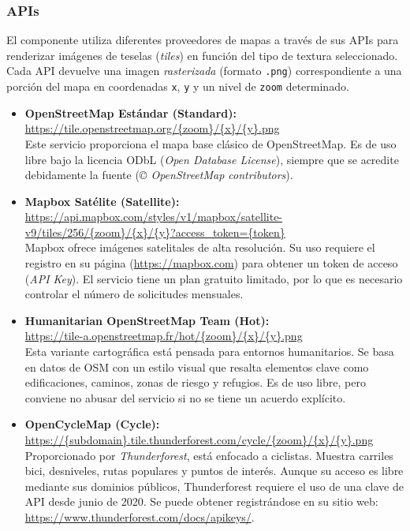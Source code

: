 \documentclass[a4paper, 12pt]{book}
\begin{document}
\subsubsection*{APIs}

El componente utiliza diferentes proveedores de mapas a través de sus APIs para renderizar imágenes de teselas (\textit{tiles}) en función del tipo de textura seleccionado. Cada API devuelve una imagen \textit{rasterizada} (formato \texttt{.png}) correspondiente a una porción del mapa en coordenadas \texttt{x}, \texttt{y} y un nivel de \texttt{zoom} determinado.

\begin{itemize}
    \item \textbf{OpenStreetMap Estándar (Standard):} \\
    \url{https://tile.openstreetmap.org/\{zoom\}/\{x\}/\{y\}.png} \\
    Este servicio proporciona el mapa base clásico de OpenStreetMap. Es de uso libre bajo la licencia ODbL (\textit{Open Database License}), siempre que se acredite debidamente la fuente (\textit{© OpenStreetMap contributors}).

    \item \textbf{Mapbox Satélite (Satellite):} \\
    \url{https://api.mapbox.com/styles/v1/mapbox/satellite-v9/tiles/256/\{zoom\}/\{x\}/\{y\}?access_token=\{token\}} \\
    Mapbox ofrece imágenes satelitales de alta resolución. Su uso requiere el registro en su página (\url{https://mapbox.com}) para obtener un token de acceso (\textit{API Key}). El servicio tiene un plan gratuito limitado, por lo que es necesario controlar el número de solicitudes mensuales.

    \item \textbf{Humanitarian OpenStreetMap Team (Hot):} \\
    \url{https://tile-a.openstreetmap.fr/hot/\{zoom\}/\{x\}/\{y\}.png} \\
    Esta variante cartográfica está pensada para entornos humanitarios. Se basa en datos de OSM con un estilo visual que resalta elementos clave como edificaciones, caminos, zonas de riesgo y refugios. Es de uso libre, pero conviene no abusar del servicio si no se tiene un acuerdo explícito.

    \item \textbf{OpenCycleMap (Cycle):} \\
    \url{https://\{subdomain\}.tile.thunderforest.com/cycle/\{zoom\}/\{x\}/\{y\}.png} \\
    Proporcionado por \textit{Thunderforest}, está enfocado a ciclistas. Muestra carriles bici, desniveles, rutas populares y puntos de interés. Aunque su acceso es libre mediante sus dominios públicos, Thunderforest requiere el uso de una clave de API desde junio de 2020. Se puede obtener registrándose en su sitio web: \url{https://www.thunderforest.com/docs/apikeys/}.


\end{itemize}
\end{document}
